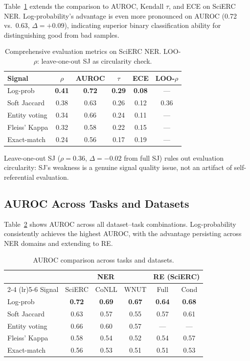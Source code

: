 \documentclass[11pt,a4paper]{article}
\begin{document}
Table~\ref{tab:full_metrics} extends the comparison to AUROC, Kendall $\tau$, and ECE on SciERC NER. Log-probability's advantage is even more pronounced on AUROC (0.72 vs.\ 0.63, $\Delta=+0.09$), indicating superior binary classification ability for distinguishing good from bad samples.

\begin{table}[t]
\centering
\small
\caption{Comprehensive evaluation metrics on SciERC NER. LOO-$\rho$: leave-one-out SJ as circularity check.}
\label{tab:full_metrics}
\begin{tabular}{lcccc@{\hskip 6pt}c}
\toprule
Signal & $\rho$ & AUROC & $\tau$ & ECE & LOO-$\rho$ \\
\midrule
Log-prob      & \textbf{0.41} & \textbf{0.72} & \textbf{0.29} & \textbf{0.08} & --- \\
Soft Jaccard  & 0.38 & 0.63 & 0.26 & 0.12 & 0.36 \\
Entity voting & 0.34 & 0.66 & 0.24 & 0.11 & --- \\
Fleiss' Kappa & 0.32 & 0.58 & 0.22 & 0.15 & --- \\
Exact-match   & 0.24 & 0.56 & 0.17 & 0.19 & --- \\
\bottomrule
\end{tabular}
\end{table}

Leave-one-out SJ ($\rho=0.36$, $\Delta=-0.02$ from full SJ) rules out evaluation circularity: SJ's weakness is a genuine signal quality issue, not an artifact of self-referential evaluation.

\subsection{AUROC Across Tasks and Datasets}

Table~\ref{tab:auroc_cross} shows AUROC across all dataset--task combinations. Log-probability consistently achieves the highest AUROC, with the advantage persisting across NER domains and extending to RE.

\begin{table}[t]
\centering
\small
\caption{AUROC comparison across tasks and datasets.}
\label{tab:auroc_cross}
\begin{tabular}{lccccc}
\toprule
 & \multicolumn{3}{c}{NER} & \multicolumn{2}{c}{RE (SciERC)} \\
\cmidrule(lr){2-4} \cmidrule(lr){5-6}
Signal & SciERC & CoNLL & WNUT & Full & Cond \\
\midrule
Log-prob      & \textbf{0.72} & \textbf{0.69} & \textbf{0.67} & \textbf{0.64} & \textbf{0.68} \\
Soft Jaccard  & 0.63 & 0.57 & 0.55 & 0.57 & 0.61 \\
Entity voting & 0.66 & 0.60 & 0.57 & --- & --- \\
Fleiss' Kappa & 0.58 & 0.54 & 0.52 & 0.54 & 0.57 \\
Exact-match   & 0.56 & 0.53 & 0.51 & 0.51 & 0.53 \\
\bottomrule
\end{tabular}
\end{table}
\end{document}
